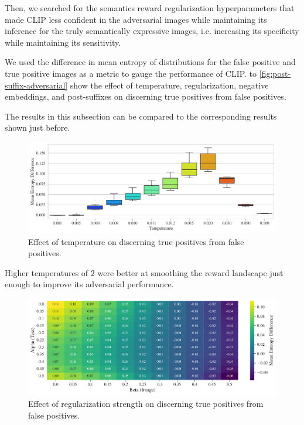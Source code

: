 Then, we searched for the semantics reward regularization hyperparameters that made CLIP less confident in the adversarial images while maintaining its inference for the truly semantically expressive images, i.e. increasing its specificity while maintaining its sensitivity.

We used the difference in mean entropy of distributions for the false positive and true positive images as a metric to gauge the performance of CLIP.
 to \ref{fig:post-suffix-adversarial} show the effect of temperature, regularization, negative embeddings, and post-suffixes on discerning true positives from false positives.

The results in this subsection can be compared to the corresponding results shown just before.

\begin{figure}[H]
    \centering
    \includegraphics[width=\textwidth]{images/temperature_adversarial.pdf}
    \caption{Effect of temperature on discerning true positives from false positives.}
    \label{fig:clip-temperature-adversarial}
\end{figure}

Higher temperatures of \(2\) were better at smoothing the reward landscape just enough to improve its adversarial performance.

\begin{figure}[H]
    \centering
    \includegraphics[width=\textwidth]{images/alpha_beta_adversarial.pdf}
    \caption{Effect of regularization strength on discerning true positives from false positives.}
    \label{fig:clip-alpha-beta-adversarial}
\end{figure}

